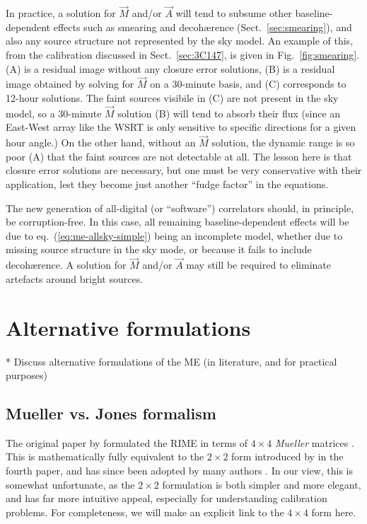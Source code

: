 \documentclass[]{aa}
\begin{document}
In practice, a solution for $\vec M$ and/or $\vec A$ will tend to subsume other baseline-dependent effects such as smearing and decoh{\ae}rence (Sect.~\ref{sec:smearing}), and also any source structure not represented by the sky model. An example of this, from the calibration discussed in Sect.~\ref{sec:3C147}, is given in Fig.~\ref{fig:smearing}. (A) is a residual image without any closure error solutions, (B) is a residual image obtained by solving for $\vec M$ on a 30-minute basis, and (C) corresponds to 12-hour solutions. The faint sources visibile in (C) are not present in the sky model, so a 30-minute $\vec M$ solution (B) will tend to absorb their flux (since an East-West array like the WSRT is only sensitive to specific directions for a given hour angle.) On the other hand, without an $\vec M$ solution, the dynamic range is so poor (A) that the faint sources are not detectable at all. The lesson here is that closure error solutions are necessary, but one must be very conservative with their application, lest they become just another ``fudge factor'' in the equations.

The new generation of all-digital (or ``software'') correlators should, in principle, be corruption-free. In this case, all remaining baseline-dependent effects will be due to eq.~(\ref{eq:me-allsky-simple}) being an incomplete model, whether due to missing source structure in the sky mode, or because it fails to include decoh{\ae}rence. A solution for $\vec M$ and/or $\vec A$ may still be required to eliminate artefacts around bright sources.


\section{\label{sec:formulations}Alternative formulations}

* Discuss alternative formulations of the ME (in literature, and for practical purposes)

\subsection{Mueller vs. Jones formalism}

The original paper by \citet{ME1} formulated the RIME in terms of $4\times4$ {\em Mueller} matrices \citep{Muller}. This is mathematically fully equivalent to the $2\times2$ form introduced by \citet{ME4} in the fourth paper, and has since been adopted by many authors \citep{JEN:note185,tms,SB:imageplane,Rau:DDEs}. In our view, this is somewhat unfortunate, as the $2\times2$ formulation is both simpler and more elegant, and has far more intuitive appeal, especially for understanding calibration problems. For completeness, we will make an explicit link to the $4\times4$ form here.
\end{document}
